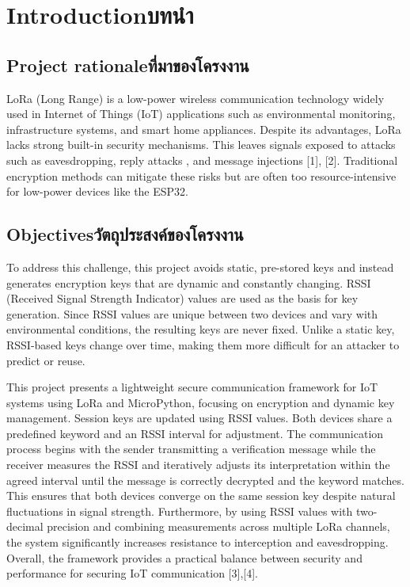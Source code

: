 \chapter{\ifenglish Introduction\else บทนำ\fi}

\section{\ifenglish Project rationale\else ที่มาของโครงงาน\fi}

LoRa (Long Range) is a low-power wireless communication technology widely used in Internet of Things (IoT) applications such as environmental monitoring, infrastructure systems, and smart home appliances. Despite its advantages, LoRa lacks strong built-in security mechanisms. This leaves signals exposed to attacks such as eavesdropping, reply attacks , and message injections [1], [2]. Traditional encryption methods can mitigate these risks but are often too resource-intensive for low-power devices like the ESP32.

\section{\ifenglish Objectives\else วัตถุประสงค์ของโครงงาน\fi}

To address this challenge, this project avoids static, pre-stored keys and instead generates encryption keys that are dynamic and constantly changing. RSSI (Received Signal Strength Indicator) values are used as the basis for key generation. Since RSSI values are unique between two devices and vary with environmental conditions, the resulting keys are never fixed. Unlike a static key, RSSI-based keys change over time, making them more difficult for an attacker to predict or reuse.

This project presents a lightweight secure communication framework for IoT systems using LoRa and MicroPython, focusing on encryption and dynamic key management. Session keys are updated using RSSI values. Both devices share a predefined keyword and an RSSI interval for adjustment. The communication process begins with the sender transmitting a verification message while the receiver measures the RSSI and iteratively adjusts its interpretation within the agreed interval until the message is correctly decrypted and the keyword matches. This ensures that both devices converge on the same session key despite natural fluctuations in signal strength. Furthermore, by using RSSI values with two-decimal precision and combining measurements across multiple LoRa channels, the system significantly increases resistance to interception and eavesdropping. Overall, the framework provides a practical balance between security and performance for securing IoT communication [3],[4].

